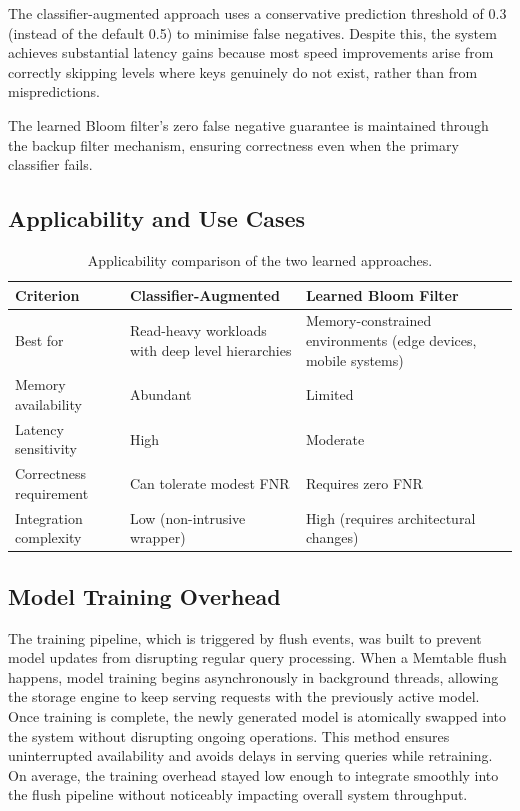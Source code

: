 \documentclass{mnitjaipur}
\begin{document}
The classifier-augmented approach uses a conservative prediction threshold of 0.3 (instead of the default 0.5) to minimise false negatives. Despite this, the system achieves substantial latency gains because most speed improvements arise from correctly skipping levels where keys genuinely do not exist, rather than from mispredictions.

The learned Bloom filter's zero false negative guarantee is maintained through the backup filter mechanism, ensuring correctness even when the primary classifier fails.

\subsection{Applicability and Use Cases}

\begin{table}[h]
    \centering
    \begin{tabular}{p{4cm}p{5cm}p{5cm}}
        \toprule
        \textbf{Criterion} & \textbf{Classifier-Augmented} & \textbf{Learned Bloom Filter} \\
        \midrule
        Best for & Read-heavy workloads with deep level hierarchies & Memory-constrained environments (edge devices, mobile systems) \\
        Memory availability & Abundant & Limited \\
        Latency sensitivity & High & Moderate \\
        Correctness requirement & Can tolerate modest FNR & Requires zero FNR \\
        Integration complexity & Low (non-intrusive wrapper) & High (requires architectural changes) \\
        \bottomrule
    \end{tabular}
    \caption{Applicability comparison of the two learned approaches.}
    \label{tab:applicability}
\end{table}

\subsection{Model Training Overhead}

The training pipeline, which is triggered by flush events, was built to prevent model updates from disrupting regular query processing. When a Memtable flush happens, model training begins asynchronously in background threads, allowing the storage engine to keep serving requests with the previously active model. Once training is complete, the newly generated model is atomically swapped into the system without disrupting ongoing operations. This method ensures uninterrupted availability and avoids delays in serving queries while retraining. On average, the training overhead stayed low enough to integrate smoothly into the flush pipeline without noticeably impacting overall system throughput. 
\end{document}
